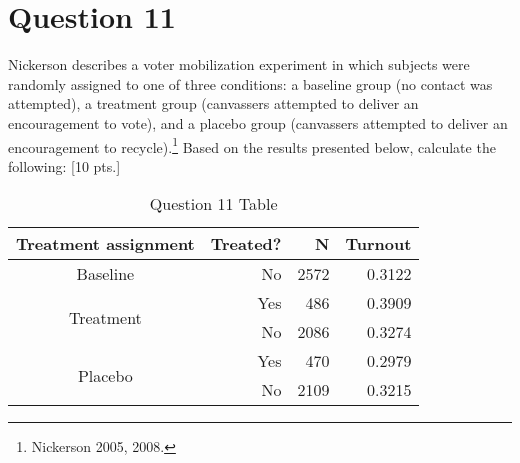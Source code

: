 \documentclass[11pt,notitlepage]{article}\usepackage[]{graphicx}\usepackage[]{color}
\begin{document}
\section*{Question 11}
Nickerson describes a voter mobilization experiment in which subjects were randomly assigned to one of three conditions: a baseline group (no contact was attempted), a treatment group (canvassers attempted to deliver an encouragement to vote), and a placebo group (canvassers attempted to deliver an encouragement to recycle).\footnote{Nickerson 2005, 2008.} Based on the results presented below, calculate the following: [10 pts.]
\begin{table}[H]
  \centering
  \caption{Question 11 Table}
    \begin{tabular}{rrrr}
    \toprule
    Treatment assignment  & Treated?  & N     & Turnout  \\
    \midrule
    \multicolumn{1}{c}{Baseline}  & No    & 2572  & 0.3122 \\
    \multicolumn{1}{c}{\multirow{2}[0]{*}{Treatment }} & Yes   & 486   & 0.3909 \\
    \multicolumn{1}{c}{} & No    & 2086  & 0.3274 \\
    \multicolumn{1}{c}{\multirow{2}[0]{*}{Placebo }} & Yes   & 470   & 0.2979 \\
    \multicolumn{1}{c}{} & No    & 2109  & 0.3215 \\
    \bottomrule
    \end{tabular}%
  \label{tab:addlabel}%
\end{table}%
\end{document}
